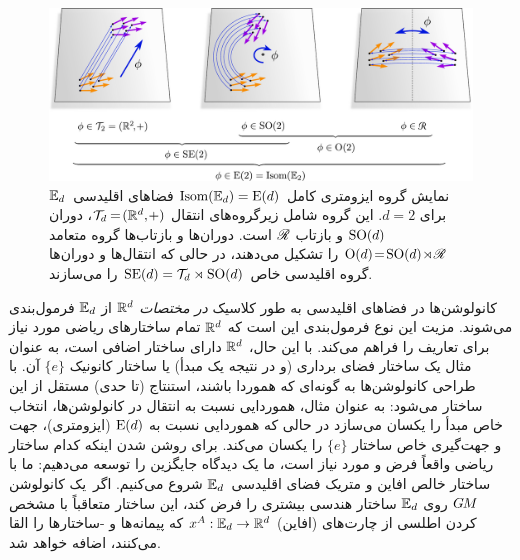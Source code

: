 \begin{figure}
	\centering
	\includegraphics[width=1.\textwidth]{figures/isometry_plane.pdf}
	\vspace*{.1ex}
	\caption{\small
		نمایش گروه ایزومتری کامل $\operatorname{Isom}(\mathbb{E}_d) = \operatorname{E}(d)$ فضاهای اقلیدسی~$\mathbb{E}_d$ برای $d=2$.
		این گروه شامل زیرگروه‌های انتقال $\mathcal{T}_d \mkern-1mu=\! (\mathbb{R}^d,\mkern-2mu+)$، دوران $\operatorname{SO}(d)$ و بازتاب $\mathscr{R}$ است.
		دوران‌ها و بازتاب‌ها گروه متعامد ${\operatorname{O}(d) \!=\! \operatorname{SO}(d) \!\rtimes\! \mathscr{R}}$ را تشکیل می‌دهند، در حالی که انتقال‌ها و دوران‌ها گروه اقلیدسی خاص $\operatorname{SE}(d) = \mathcal{T}_d \rtimes \operatorname{SO}(d)$ را می‌سازند.
	}
	\label{fig:isometries_plane}
\end{figure}

کانولوشن‌ها در فضاهای اقلیدسی به طور کلاسیک \emph{در مختصات} $\mathbb{R}^d$ از $\mathbb{E}_d$ فرمول‌بندی می‌شوند.
مزیت این نوع فرمول‌بندی این است که $\mathbb{R}^d$ تمام ساختارهای ریاضی مورد نیاز برای تعاریف را فراهم می‌کند.
با این حال، $\mathbb{R}^d$ دارای ساختار اضافی است، به عنوان مثال یک ساختار فضای برداری (و در نتیجه یک مبدأ) یا ساختار کانونیک $\{e\}$ آن.
با طراحی کانولوشن‌ها به گونه‌ای که هموردا باشند، استنتاج (تا حدی) مستقل از این ساختار می‌شود:
به عنوان مثال، هموردایی نسبت به انتقال در کانولوشن‌ها، انتخاب خاص مبدأ را یکسان می‌سازد در حالی که هموردایی نسبت به $\operatorname{E}(d)$ (ایزومتری)، جهت و جهت‌گیری خاص ساختار $\{e\}$ را یکسان می‌کند.
برای روشن شدن اینکه کدام ساختار ریاضی واقعاً فرض و مورد نیاز است، ما یک دیدگاه جایگزین را توسعه می‌دهیم:
ما با ساختار خالص افاین و متریک فضای اقلیدسی~$\mathbb{E}_d$ شروع می‌کنیم.
اگر~یک کانولوشن $G\mkern-1.4muM$ روی $\mathbb{E}_d$ ساختار هندسی بیشتری را فرض کند، این ساختار متعاقباً با مشخص کردن اطلسی از چارت‌های (افاین) $x^A: \mathbb{E}_d \to \mathbb{R}^d$ که پیمانه‌ها و -ساختارها را القا می‌کنند، اضافه خواهد شد.

\pagebreak

\etocsettocstyle{}{} %
\localtableofcontents


